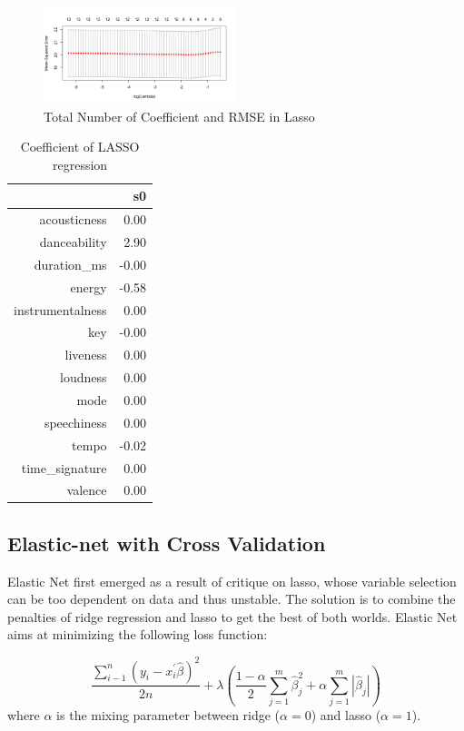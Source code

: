 \documentclass[conference]{IEEEtran}
\begin{document}
\begin{figure}[htbp]
\centerline{\includegraphics[width=0.5\textwidth]{figure/cvfitlasso.png}}
\caption{Total Number of Coefficient and RMSE in Lasso}
\label{Total Number of Coefficient and RMSE in Lasso}
\end{figure}

\begin{table}[ht]
\centering
\caption{Coefficient of LASSO regression}
\begin{tabular}{rr}
  \hline
 & s0 \\ 
  \hline
acousticness & 0.00 \\ 
  danceability & 2.90 \\ 
  duration\_ms & -0.00 \\ 
  energy & -0.58 \\ 
  instrumentalness & 0.00 \\ 
  key & -0.00 \\ 
  liveness & 0.00 \\ 
  loudness & 0.00 \\ 
  mode & 0.00 \\ 
  speechiness & 0.00 \\ 
  tempo & -0.02 \\ 
  time\_signature & 0.00 \\ 
  valence & 0.00 \\ 
   \hline
\end{tabular}
\label{Coefficient of LASSO regression}		
\end{table}

\subsection{Elastic-net with Cross Validation}
Elastic Net first emerged as a result of critique on lasso, whose variable selection can be too dependent on data and thus unstable. The solution is to combine the penalties of ridge regression and lasso to get the best of both worlds. Elastic Net aims at minimizing the following loss function:

\begin{equation}
  \frac{\sum\limits_{i-1}^{n}\left(y_{i}-x_{i}^{\prime} \hat{\beta}\right)^{2}}{2 n}+\lambda\left(\frac{1-\alpha}{2} \sum_{j=1}^{m} \hat{\beta}_{j}^{2}+\alpha \sum_{j=1}^{m}\left|\hat{\beta}_{j}\right|\right)
\end{equation}
where $\alpha$ is the mixing parameter between ridge ($\alpha=0$) and lasso ($\alpha=1$).
\end{document}
